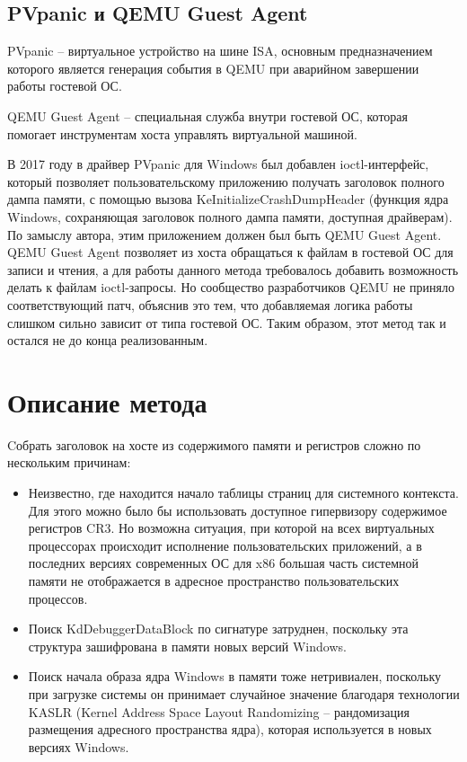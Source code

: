 \documentclass{mipt-thesis-bs}
\begin{document}
\newpage
\section*{PVpanic и QEMU Guest Agent}

PVpanic -- виртуальное устройство на шине ISA, основным предназначением которого является генерация события в QEMU при аварийном завершении работы гостевой ОС.

QEMU Guest Agent -- специальная служба внутри гостевой ОС, которая помогает инструментам хоста управлять виртуальной машиной.

В 2017 году в драйвер PVpanic для Windows был добавлен ioctl-интерфейс, который позволяет пользовательскому приложению получать заголовок полного дампа памяти, с помощью вызова KeInitializeCrashDumpHeader (функция ядра Windows, сохраняющая заголовок полного дампа памяти, доступная драйверам\cite{kicdh}). По замыслу автора, этим приложением должен был быть QEMU Guest Agent. QEMU Guest Agent позволяет из хоста обращаться к файлам в гостевой ОС для записи и чтения, а для работы данного метода требовалось добавить возможность делать к файлам ioctl-запросы. Но сообщество разработчиков QEMU не приняло соответствующий патч, объяснив это тем, что добавляемая логика работы слишком сильно зависит от типа гостевой ОС.
Таким образом, этот метод так и остался не до конца реализованным.

\chapter{Описание метода}

Cобрать заголовок на хосте из содержимого памяти и регистров сложно по нескольким причинам:

\begin{itemize}
\item Неизвестно, где находится начало таблицы страниц для системного контекста. Для этого можно было бы использовать доступное гипервизору содержимое регистров CR3. Но возможна ситуация, при которой на всех виртуальных процессорах происходит исполнение пользовательских приложений, а в последних версиях современных ОС для x86 большая часть системной памяти не отображается в адресное пространство пользовательских процессов.
\item Поиск KdDebuggerDataBlock по сигнатуре затруднен, поскольку эта структура зашифрована в памяти новых версий Windows.
\item Поиск начала образа ядра Windows в памяти тоже нетривиален, поскольку при загрузке системы он принимает случайное значение благодаря технологии KASLR (Kernel Address Space Layout Randomizing -- рандомизация размещения адресного пространства ядра), которая используется в новых версиях Windows.
\end{itemize}
\end{document}
